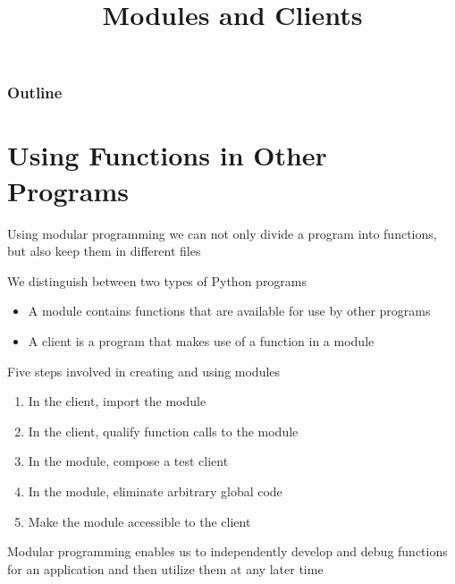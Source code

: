 \documentclass[8pt,a4paper,compress]{beamer}
\title{Modules and Clients}
\date{}
\begin{document}
\begin{frame}
\vfill
\titlepage
\end{frame}

\begin{frame}
\frametitle{Outline}
\tableofcontents
\end{frame}

\section{Using Functions in Other Programs}
\begin{frame}[fragile]
\pause

Using modular programming we can not only divide a program into functions, but also keep them in different files

\pause
\bigskip

We distinguish between two types of Python programs
\begin{itemize}
\item A module contains functions that are available for use by other programs

\item A client is a program that makes use of a function in a module
\end{itemize}

\pause
\bigskip

Five steps involved in creating and using modules
\begin{enumerate}
\item In the client, import the module

\item In the client, qualify function calls to the module

\item In the module, compose a test client

\item In the module, eliminate arbitrary global code

\item Make the module accessible to the client
\end{enumerate}

\pause
\bigskip

Modular programming enables us to independently develop and debug functions for an application and then utilize them at any later time
\end{frame}
\end{document}
